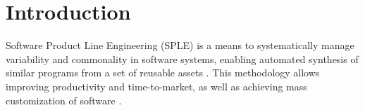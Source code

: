 %
%



%
%
%
%
%
%
%
%
%
%
%
%
%
%
%
%
%
%

\section{Introduction}
\label{sec:introduction}

Software Product Line Engineering (SPLE) is a means to systematically
manage variability and commonality in software systems, enabling automated
synthesis of similar programs from a set of reusable assets
\citep{ClementsSPL2001, PohlSPLE, FOSPL}.
This methodology allows improving productivity and time-to-market, as well as
achieving mass customization of software \citep{PohlSPLE}.

